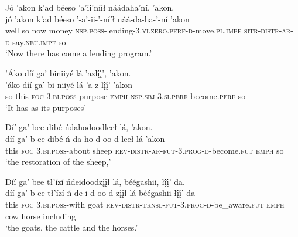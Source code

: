 \ea\label{ex:text7-16-1}
Jó ’akon k’ad béeso ’a’ii’nííł náádaha’ní, ’akon.\\
\gll jó	’akon	k’ad	béeso	’-a’-ii-’-nííł	náá-da-ha-’-ní	’akon\\
     well	so	now	money	\textsc{nsp}.\textsc{poss}-lending-3.\textsc{yi}.\textsc{zero}.\textsc{perf}-\textsc{d}-move.\textsc{pl}.\textsc{impf}	\textsc{sitr}-\textsc{distr}-\textsc{ar}-\textsc{d}-say.\textsc{neu}.\textsc{impf}	so\\
\glt `Now there has come a lending program.'
\z

\ea\label{ex:text7-16-2}
’Áko díí ga’ biniiyé lá ’azlį́į́’, ’akon.\\
\gll ’áko	díí	ga’	bi-niiyé	lá	’a-z-lį́į́’	’akon\\
     so	this	\textsc{foc}	3.\textsc{bi}.\textsc{poss}-purpose	\textsc{emph}	\textsc{nsp}.\textsc{sbj}-3.\textsc{si}.\textsc{perf}-become.\textsc{perf}	so\\
\glt `It has as its purposes'
\z

\ea\label{ex:text7-16-3}
Díí ga’ bee dibé ńdahodoodleeł lá, ’akon.\\
\gll díí	ga’	b-ee	dibé	ń-da-ho-d-oo-d-leeł	lá	’akon\\
     this	\textsc{foc}	3.\textsc{bi}.\textsc{poss}-about	sheep	\textsc{rev}-\textsc{distr}-\textsc{ar}-\textsc{fut}-3.\textsc{prog}-\textsc{d}-become.\textsc{fut}	\textsc{emph}	so\\
\glt `the restoration of the sheep,'
\z

\ea\label{ex:text7-16-4}
Díí ga’ bee tł’ízí ńdeidoodzįįł lá, béégashii, łį́į́’ da.\\
\gll díí	ga’	b-ee	tł’ízí	ń-de-i-d-oo-d-zįįł	lá	béégashii	łį́į́’	da\\
     this	\textsc{foc}	3.\textsc{bi}.\textsc{poss}-with	goat	\textsc{rev}-\textsc{distr}-\textsc{trnsl}-\textsc{fut}-3.\textsc{prog}-\textsc{d}-be\_aware.\textsc{fut}	\textsc{emph}	cow	horse	including\\
\glt `the goats, the cattle and the horses.'
\z

